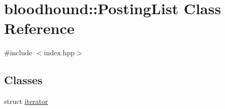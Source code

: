 \hypertarget{classbloodhound_1_1PostingList}{}\section{bloodhound\+:\+:Posting\+List Class Reference}
\label{classbloodhound_1_1PostingList}


{\ttfamily \#include $<$index.\+hpp$>$}

\subsection*{Classes}
\begin{DoxyCompactItemize}
\item 
struct \hyperlink{structbloodhound_1_1PostingList_1_1iterator}{iterator}
\end{DoxyCompactItemize}
